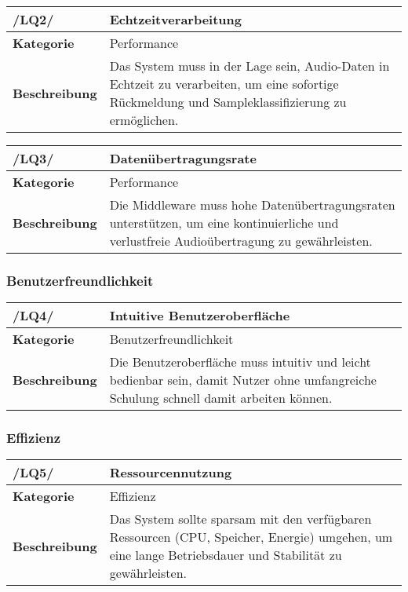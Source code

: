 \begin{table}[h!]
	\begin{tabularx}{\textwidth}{|l|X|}
		\hline
		\textbf{/LQ2/} & \textbf{Echtzeitverarbeitung} \\ \hline
		\textbf{Kategorie} & Performance \\ \hline
		\textbf{Beschreibung} & Das System muss in der Lage sein, Audio-Daten in Echtzeit zu verarbeiten, um eine sofortige Rückmeldung und Sampleklassifizierung zu ermöglichen. \\ \hline
	\end{tabularx}
\end{table}

\begin{table}[h!]
	\begin{tabularx}{\textwidth}{|l|X|}
		\hline
		\textbf{/LQ3/} & \textbf{Datenübertragungsrate} \\ \hline
		\textbf{Kategorie} & Performance \\ \hline
		\textbf{Beschreibung} & Die Middleware muss hohe Datenübertragungsraten unterstützen, um eine kontinuierliche und verlustfreie Audioübertragung zu gewährleisten. \\ \hline
	\end{tabularx}
\end{table}

\subsubsection{Benutzerfreundlichkeit}

\begin{table}[h!]
	\begin{tabularx}{\textwidth}{|l|X|}
		\hline
		\textbf{/LQ4/} & \textbf{Intuitive Benutzeroberfläche} \\ \hline
		\textbf{Kategorie} & Benutzerfreundlichkeit \\ \hline
		\textbf{Beschreibung} & Die Benutzeroberfläche muss intuitiv und leicht bedienbar sein, damit Nutzer ohne umfangreiche Schulung schnell damit arbeiten können. \\ \hline
	\end{tabularx}
\end{table}

\newpage
\subsubsection{Effizienz}

\begin{table}[h!]
	\begin{tabularx}{\textwidth}{|l|X|}
		\hline
		\textbf{/LQ5/} & \textbf{Ressourcennutzung} \\ \hline
		\textbf{Kategorie} & Effizienz \\ \hline
		\textbf{Beschreibung} & Das System sollte sparsam mit den verfügbaren Ressourcen (CPU, Speicher, Energie) umgehen, um eine lange Betriebsdauer und Stabilität zu gewährleisten. \\ \hline
	\end{tabularx}
\end{table}

